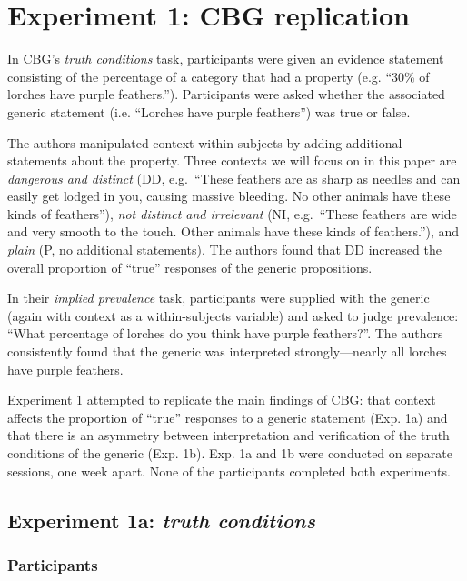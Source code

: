 \documentclass[10pt,letterpaper]{article}
\begin{document}
\section{Experiment 1: CBG replication}

In CBG's \emph{truth conditions} task, participants were given an evidence statement consisting of the percentage of a category that had a property (e.g. ``30\% of lorches have purple feathers.''). Participants were asked whether the associated generic statement (i.e. ``Lorches have purple feathers'') was true or false. 

The authors manipulated context within-subjects by adding additional statements about the property. Three contexts we will focus on in this paper are \emph{dangerous and distinct} (DD, e.g.~``These feathers are as sharp as needles and can easily get lodged in you, causing massive bleeding. No other animals have these kinds of feathers''), \emph{not distinct and irrelevant} (NI, e.g.~``These feathers are wide and very smooth to the touch. Other animals have these kinds of feathers.''), and \emph{plain} (P, no additional statements). The authors found that DD increased the overall proportion of ``true'' responses of the generic propositions. 

In their \emph{implied prevalence} task, participants were supplied with the generic (again with context as a within-subjects variable) and asked to judge prevalence: ``What percentage of lorches do you think have purple feathers?''. The authors consistently found that the generic was interpreted strongly---nearly all lorches have purple feathers. 

Experiment 1 attempted to replicate the main findings of CBG: that context affects the proportion of ``true'' responses to a generic statement (Exp. 1a) and that there is an asymmetry between interpretation and verification of the truth conditions of the generic (Exp. 1b). 
Exp. 1a and 1b were conducted on separate sessions, one week apart. None of the participants completed both experiments.

\subsection{Experiment 1a: \emph{truth conditions}}

\subsubsection{Participants}
\end{document}
